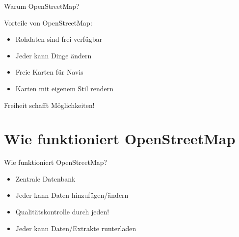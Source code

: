 \documentclass{beamer}
\begin{document}
\begin{frame}{Warum OpenStreetMap?}

Vorteile von OpenStreetMap:

\begin{itemize}
  \item Rohdaten sind frei verfügbar
  \item Jeder kann Dinge ändern
  \item Freie Karten für Navis
  \item Karten mit eigenem Stil rendern
\end{itemize}

Freiheit schafft Möglichkeiten!

\end{frame}


\section{Wie funktioniert OpenStreetMap}

\begin{frame}{Wie funktioniert OpenStreetMap?}

\begin{itemize}
  \item Zentrale Datenbank
  \item Jeder kann Daten hinzufügen/ändern
  \item Qualitätskontrolle durch jeden!
  \item Jeder kann Daten/Extrakte runterladen
\end{itemize}

\end{frame}
\end{document}
